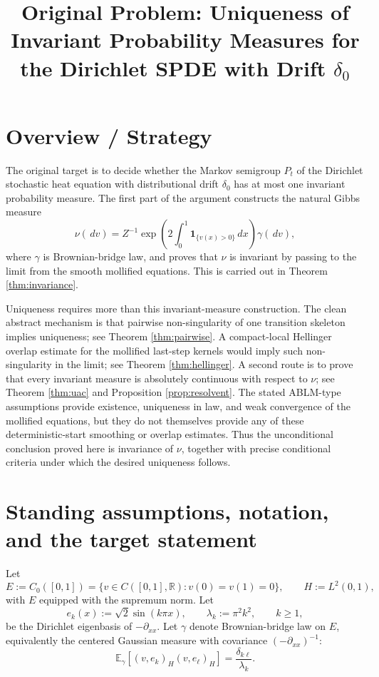 \documentclass[12pt]{article}
\title{Original Problem: Uniqueness of Invariant Probability Measures for the Dirichlet SPDE with Drift \(\delta_0\)}
\author{}
\date{}
\newcommand{\R}{\mathbb R}
\newcommand{\E}{\mathbb E}
\newcommand{\1}{\mathbf 1}
\newcommand{\dd}{\,d}
\theoremstyle{plain}
\theoremstyle{definition}
\theoremstyle{remark}
\numberwithin{equation}{section}
\begin{document}
\maketitle

\section*{Overview / Strategy}

The original target is to decide whether the Markov semigroup \(P_t\) of the
Dirichlet stochastic heat equation with distributional drift \(\delta_0\) has
at most one invariant probability measure.  The first part of the argument
constructs the natural Gibbs measure
\[
\nu(\dd v)=Z^{-1}\exp\!\left(2\int_0^1\1_{\{v(x)>0\}}\dd x\right)\gamma(\dd v),
\]
where \(\gamma\) is Brownian-bridge law, and proves that \(\nu\) is invariant by
passing to the limit from the smooth mollified equations.  This is carried out
in Theorem \ref{thm:invariance}.

Uniqueness requires more than this invariant-measure construction.  The clean
abstract mechanism is that pairwise non-singularity of one transition skeleton
implies uniqueness; see Theorem \ref{thm:pairwise}.  A compact-local Hellinger
overlap estimate for the mollified last-step kernels would imply such
non-singularity in the limit; see Theorem \ref{thm:hellinger}.  A second route is
to prove that every invariant measure is absolutely continuous with respect to
\(\nu\); see Theorem \ref{thm:uac} and Proposition \ref{prop:resolvent}.  The
stated ABLM-type assumptions provide existence, uniqueness in law, and weak
convergence of the mollified equations, but they do not themselves provide any
of these deterministic-start smoothing or overlap estimates.  Thus the
unconditional conclusion proved here is invariance of \(\nu\), together with
precise conditional criteria under which the desired uniqueness follows.

\section{Standing assumptions, notation, and the target statement}

Let
\[
E:=C_0([0,1])
=\{v\in C([0,1],\R):v(0)=v(1)=0\},
\qquad H:=L^2(0,1),
\]
with \(E\) equipped with the supremum norm.  Let
\[
e_k(x):=\sqrt2\sin(k\pi x),\qquad \lambda_k:=\pi^2k^2,\qquad k\ge1,
\]
be the Dirichlet eigenbasis of \(-\partial_{xx}\).  Let \(\gamma\) denote
Brownian-bridge law on \(E\), equivalently the centered Gaussian measure with
covariance \((-\partial_{xx})^{-1}\):
\[
\E_\gamma[(v,e_k)_H(v,e_\ell)_H]=\frac{\delta_{k\ell}}{\lambda_k}.
\]
\end{document}
